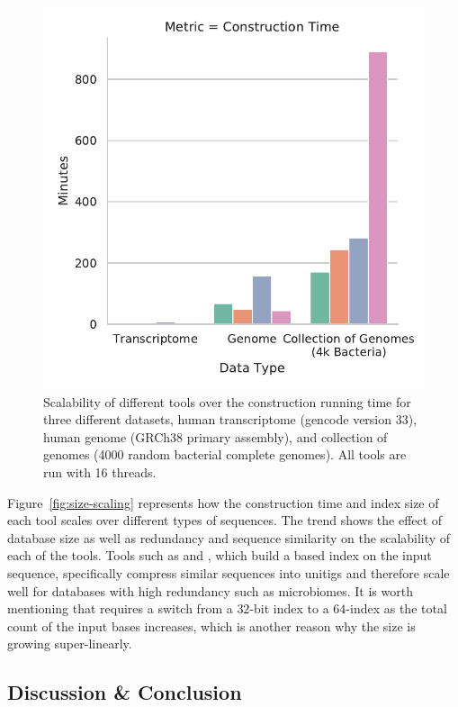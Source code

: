 \begin{figure}[h!]
    \includegraphics[width=0.8\columnwidth,type=pdf,ext=.pdf,read=.pdf]
    {Figures/puff/indexTimeScale}
    \caption[scalability of different aligners - time]
    {Scalability of different tools over the construction running time for three
    different datasets, human transcriptome (gencode version 33), human
    genome (GRCh38 primary assembly), and collection of genomes (4000
    random bacterial complete genomes). All tools are run with 16 threads.}
    \label{sfig:construction}
    \vspace{-0.2in}
\end{figure}

Figure~\ref{fig:size-scaling} represents how the construction time and
index size of each tool scales over different types of sequences. 
The trend shows the effect of database size as well as redundancy and sequence similarity on
the scalability of each of the tools. Tools such as \puffaligner and
\debga, which build a \dbg based index on the input sequence,
specifically compress similar sequences into unitigs and therefore
scale well for databases with high redundancy such as microbiomes. It is 
worth mentioning that \bt requires a switch from a $32$-bit
index to a $64$-index as the total count of the input bases
increases, which is another reason why the size is growing super-linearly.

\subsection{Discussion \& Conclusion}
\label{sec:conclusion}


